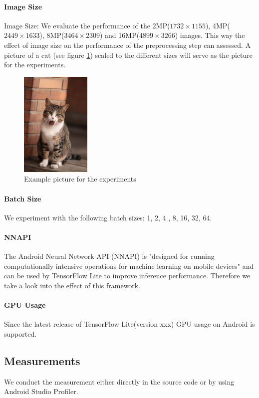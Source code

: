 \paragraph{Image Size}
Image Size: We evaluate the performance of the 2MP($1732\times1155$), 4MP($2449\times1633$), 8MP($3464\times2309$) and 16MP($4899\times3266$) images. This way the effect of image size on the performance of the preprocessing step can assessed. A picture of a cat (see figure \ref{fig:cat}) scaled to the different sizes will serve as the picture for the experiments.
\begin{figure}[H]
\centering
\includegraphics[width=0.3\textwidth]{./Bilder/European_cat_02_16_mp.jpg}
\caption{Example picture for the experiments \cite{cat}}
\label{fig:cat}
\end{figure}
\paragraph{Batch Size}
We experiment with the following batch sizes: 1, 2, 4 , 8, 16, 32, 64.
\paragraph{NNAPI}
The Android Neural Network API (NNAPI)
is "designed for running computationally intensive operations for machine learning on mobile devices" \cite{NNAPI} and can be used by TensorFlow Lite to improve inference performance. Therefore we take a look into the effect of this framework.
\paragraph{GPU Usage}
Since the latest release of TensorFlow Lite(version xxx) GPU usage on Android is supported. 

\subsection{Measurements}
We conduct the measurement either directly in the source code or by using Android Studio Profiler.
